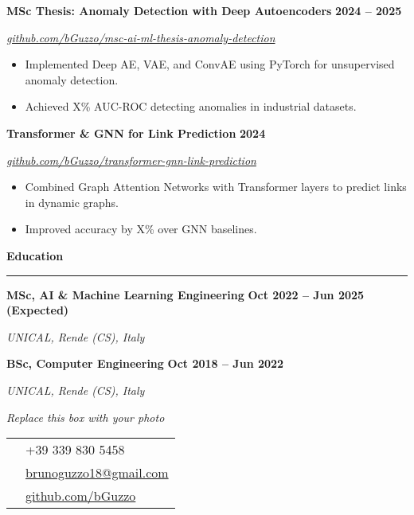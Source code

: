 \documentclass[9pt, a4paper]{article}
\newcommand{\cvsection}[1]{%
	\vspace{8pt}\par
	{\Large\bfseries\color{sectionblue}#1}\par
	\vspace{2pt}\hrule\vspace{6pt}
}
\newcommand{\cvsubsection}[3]{%
	\par {\large\bfseries #1} \hfill {\bfseries #2} \par {\textit{#3}} \vspace{4pt}
}
\begin{document}
\begin{paracol}{2}
		\cvsubsection{MSc Thesis: Anomaly Detection with Deep Autoencoders}{2024 -- 2025}{\href{https://github.com/bGuzzo/msc-ai-ml-thesis-anomaly-detection}{github.com/bGuzzo/msc-ai-ml-thesis-anomaly-detection}}
		\begin{itemize}[leftmargin=*, nosep]
			\item Implemented Deep AE, VAE, and ConvAE using PyTorch for unsupervised anomaly detection.
			\item Achieved X\% AUC-ROC detecting anomalies in industrial datasets.
		\end{itemize}
		
		\vspace{6pt}
		\cvsubsection{Transformer \& GNN for Link Prediction}{2024}{\href{https://github.com/bGuzzo/transformer-gnn-link-prediction}{github.com/bGuzzo/transformer-gnn-link-prediction}}
		\begin{itemize}[leftmargin=*, nosep]
			\item Combined Graph Attention Networks with Transformer layers to predict links in dynamic graphs.
			\item Improved accuracy by X\% over GNN baselines.
		\end{itemize}
		
		\cvsection{Education}
		
		\cvsubsection{MSc, AI \& Machine Learning Engineering}{Oct 2022 -- Jun 2025 (Expected)}{UNICAL, Rende (CS), Italy}
		\cvsubsection{BSc, Computer Engineering}{Oct 2018 -- Jun 2022}{UNICAL, Rende (CS), Italy}
		
		\switchcolumn
		
		\begin{center}
			\fbox{\rule{0pt}{4.5cm}\hspace{4.5cm}}\par
			\small\textit{Replace this box with your photo}
		\end{center}
		\vspace{8pt}
		
		\begin{tabularx}{\linewidth}{@{}lX@{}}
			\faPhone & +39 339 830 5458 \\
			\faEnvelope & \href{mailto:brunoguzzo18@gmail.com}{brunoguzzo18@gmail.com} \\
			\faGithub & \href{https://github.com/bGuzzo}{github.com/bGuzzo} \\
		\end{tabularx}
		

\end{paracol}
\end{document}
